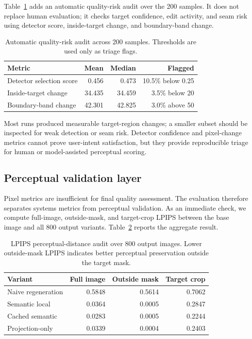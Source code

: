 \documentclass[final,5p,times,number,sort&compress]{elsarticle}
\begin{document}
Table~\ref{tab:quality-audit} adds an automatic quality-risk audit over the 200 samples. It does not replace human evaluation; it checks target confidence, edit activity, and seam risk using detector score, inside-target change, and boundary-band change.

\begin{table}[t]
\centering
\scriptsize
\caption{Automatic quality-risk audit across 200 samples. Thresholds are used only as triage flags.}
\label{tab:quality-audit}
\begin{tabular}{lrrr}
\toprule
Metric & Mean & Median & Flagged \\
\midrule
Detector selection score & 0.456 & 0.473 & 10.5\% below 0.25 \\
Inside-target change & 34.435 & 34.459 & 3.5\% below 20 \\
Boundary-band change & 42.301 & 42.825 & 3.0\% above 50 \\
\bottomrule
\end{tabular}
\end{table}

Most runs produced measurable target-region changes; a smaller subset should be inspected for weak detection or seam risk. Detector confidence and pixel-change metrics cannot prove user-intent satisfaction, but they provide reproducible triage for human or model-assisted perceptual scoring.

\subsection{Perceptual validation layer}

Pixel metrics are insufficient for final quality assessment. The evaluation therefore separates systems metrics from perceptual validation. As an immediate check, we compute full-image, outside-mask, and target-crop LPIPS between the base image and all 800 output variants. Table~\ref{tab:lpips-results} reports the aggregate result.

\begin{table}[t]
\centering
\scriptsize
\caption{LPIPS perceptual-distance audit over 800 output images. Lower outside-mask LPIPS indicates better perceptual preservation outside the target mask.}
\label{tab:lpips-results}
\begin{tabular}{lrrr}
\toprule
Variant & Full image & Outside mask & Target crop \\
\midrule
Naive regeneration & 0.5848 & 0.5614 & 0.7062 \\
Semantic local & 0.0364 & 0.0005 & 0.2847 \\
Cached semantic & 0.0283 & 0.0005 & 0.2244 \\
Projection-only & 0.0339 & 0.0004 & 0.2403 \\
\bottomrule
\end{tabular}
\end{table}
\end{document}

